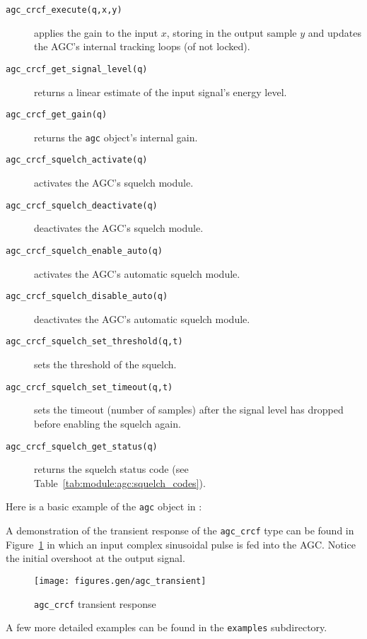 \begin{description}
\item[{\tt agc\_crcf\_execute(q,x,y)}]
    applies the gain to the input $x$, storing in the output sample $y$
    and updates the AGC's internal tracking loops (of not locked).
\item[{\tt agc\_crcf\_get\_signal\_level(q)}]
    returns a linear estimate of the input signal's energy level.
\item[{\tt agc\_crcf\_get\_gain(q)}]
    returns the {\tt agc} object's internal gain.
\item[{\tt agc\_crcf\_squelch\_activate(q)}]
    activates the AGC's squelch module.
\item[{\tt agc\_crcf\_squelch\_deactivate(q)}]
    deactivates the AGC's squelch module.
\item[{\tt agc\_crcf\_squelch\_enable\_auto(q)}]
    activates the AGC's automatic squelch module.
\item[{\tt agc\_crcf\_squelch\_disable\_auto(q)}]
    deactivates the AGC's automatic squelch module.
\item[{\tt agc\_crcf\_squelch\_set\_threshold(q,t)}]
    sets the threshold of the squelch.
\item[{\tt agc\_crcf\_squelch\_set\_timeout(q,t)}]
    sets the timeout (number of samples) after the signal level has dropped
    before enabling the squelch again.
\item[{\tt agc\_crcf\_squelch\_get\_status(q)}]
    returns the squelch status code
    (see Table~\ref{tab:module:agc:squelch_codes}).
\end{description}
%
Here is a basic example of the {\tt agc} object in \liquid:
%

%
A demonstration of the transient response of the {\tt agc\_crcf} type can be
found in Figure~\ref{fig:module:agc:transient} in which an input complex
sinusoidal pulse is fed into the AGC.
Notice the initial overshoot at the output signal.%
%
\begin{figure}
\centering
  \texttt{[image: figures.gen/agc\_transient]}
\caption{{\tt agc\_crcf} transient response}
\label{fig:module:agc:transient}
\end{figure}
%
A few more detailed examples can be found in the {\tt examples}
subdirectory.
